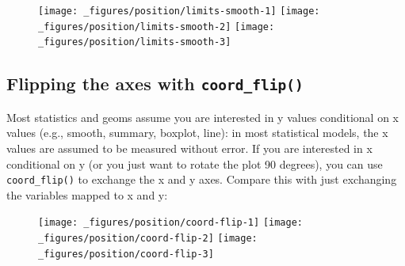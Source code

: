 \begin{figure}[H]
  \texttt{[image: \_figures/position/limits-smooth-1]}%
  \texttt{[image: \_figures/position/limits-smooth-2]}%
  \texttt{[image: \_figures/position/limits-smooth-3]}
\end{figure}

\subsection{\texorpdfstring{Flipping the axes with
\texttt{coord\_flip()}}{Flipping the axes with coord\_flip()}}

\label{sub:coord-flip}

Most statistics and geoms assume you are interested in y values
conditional on x values (e.g., smooth, summary, boxplot, line): in most
statistical models, the x values are assumed to be measured without
error. If you are interested in x conditional on y (or you just want to
rotate the plot 90 degrees), you can use \texttt{coord\_flip()} to
exchange the x and y axes. Compare this with just exchanging the
variables mapped to x and y: 
 

\begin{Shaded}
\begin{Highlighting}[]
\StringTok{ }
\StringTok{  }\NormalTok{() +}\StringTok{ }
\StringTok{  }\NormalTok{()}
\StringTok{ }
\StringTok{  }\NormalTok{() +}\StringTok{ }
\StringTok{  }\NormalTok{()}
\StringTok{ }
\StringTok{  }\NormalTok{() +}\StringTok{ }
\StringTok{  }\NormalTok{() +}\StringTok{ }
\StringTok{  }\NormalTok{()}
\end{Highlighting}
\end{Shaded}

\begin{figure}[H]
  \texttt{[image: \_figures/position/coord-flip-1]}%
  \texttt{[image: \_figures/position/coord-flip-2]}%
  \texttt{[image: \_figures/position/coord-flip-3]}
\end{figure}

